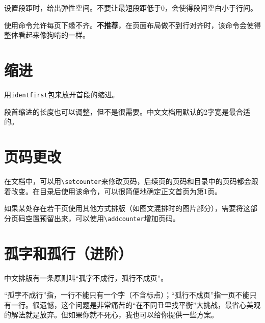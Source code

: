 \documentclass[10pt,openany]{book}
\begin{document}
\begin{sloppypar}
    \begin{tightenum}
        \item   设置段距时，给出弹性空间。不要让最短段距低于0，会使得段间空白小于行间。
        \item   使用命令允许每页下缘不齐。\textbf{不推荐}，在页面布局做不到行对齐时，该命令会使得整体看起来像狗啃的一样。
    \end{tightenum}

    

    \section{缩进}

    用\texttt{identfirst}包来放开首段的缩进。

    

    段首缩进的长度也可以调整，但不是很需要。中文文档用默认的2字宽是最合适的。

    

    \section{页码更改}

    在文档中，可以用\texttt{\textbackslash{}setcounter}来修改页码，后续页的页码和目录中的页码都会跟着改变。在目录后使用该命令，可以很简便地确定正文首页为第1页。

    

    如果某处存在若干页使用其他方式排版（如图文混排时的图片部分），需要将这部分页码空置预留出来，可以使用\texttt{\textbackslash{}addcounter}增加页码。

    

    \section{孤字和孤行（进阶）}

    中文排版有一条原则叫“孤字不成行，孤行不成页”。

    “孤字不成行”指，一行不能只有一个字（不含标点）；“孤行不成页”指一页不能只有一行。很遗憾，这个问题是非常痛苦的“在不同丑里找平衡”大挑战，最省心美观的解法就是放弃。但如果你就不死心，我也可以给你提供一些方案。


\end{sloppypar}
\end{document}
